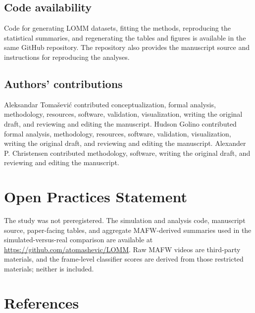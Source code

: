 \documentclass[
]{article}
\begin{document}
\subsection{Code availability}\label{code-availability}

Code for generating LOMM datasets, fitting the methods, reproducing the
statistical summaries, and regenerating the tables and figures is
available in the same GitHub repository. The repository also provides
the manuscript source and instructions for reproducing the analyses.

\subsection{Authors' contributions}\label{authors-contributions}

Aleksandar Tomašević contributed conceptualization, formal analysis,
methodology, resources, software, validation, visualization, writing the
original draft, and reviewing and editing the manuscript. Hudson Golino
contributed formal analysis, methodology, resources, software,
validation, visualization, writing the original draft, and reviewing and
editing the manuscript. Alexander P. Christensen contributed
methodology, software, writing the original draft, and reviewing and
editing the manuscript.

\section{Open Practices Statement}\label{open-practices-statement}

The study was not preregistered. The simulation and analysis code,
manuscript source, paper-facing tables, and aggregate MAFW-derived
summaries used in the simulated-versus-real comparison are available at
\url{https://github.com/atomashevic/LOMM}. Raw MAFW videos are
third-party materials, and the frame-level classifier scores are derived
from those restricted materials; neither is included.

\section{References}\label{references}

\begingroup
\setlength{\parindent}{-0.5in}
\setlength{\leftskip}{0.5in}
\end{document}
